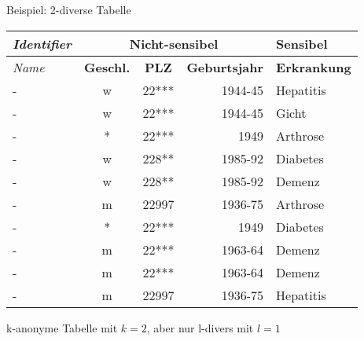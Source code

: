 \begin{frame}{Beispiel: 2-diverse Tabelle}
	\begin{center}
			\begin{tabular}{|l|c|c|r|l|}
		\hline \textit{Identifier} & \multicolumn{3}{c|}{\textbf{Nicht-sensibel}} & \textbf{Sensibel} \\ 
		\hline \textit{Name} & \textbf{Geschl.} & \textbf{PLZ} & \textbf{Geburtsjahr} & \textbf{Erkrankung} \\ \hline
		\hline \rowcolor{svshellblau1!30} 	- & w & 22*** & 1944-45 & Hepatitis \\ 
		\hline \rowcolor{svshellblau1!30}	- & w & 22*** & 1944-45 & Gicht \\ 
		\hline \rowcolor{svsgrau1!30} 		- & * & 22*** & 1949 & Arthrose \\ 
		\hline \rowcolor{svshellblau2!30} 	- & w & 228** & 1985-92 & Diabetes \\
		\hline \rowcolor{svshellblau2!30} 	- & w & 228** & 1985-92 & Demenz \\  
		\hline \rowcolor{white} 		- & m & 22997 & 1936-75 & Arthrose \\ 
		\hline \rowcolor{svsgrau1!30} 		- & * & 22*** & 1949 & Diabetes \\ 
		\hline \rowcolor{svsrot!30} 		- & m & 22*** & 1963-64 & Demenz \\ 
		\hline \rowcolor{svsrot!30} 		- & m & 22*** & 1963-64 & Demenz \\ 
		\hline \rowcolor{white} 		- & m & 22997 & 1936-75 & Hepatitis \\ 
		\hline 
		\end{tabular}
		\vspace{0.5cm}
        
		k-anonyme Tabelle mit \(k=2\), aber nur l-divers mit \(l=1\)
	\end{center}
\end{frame}


